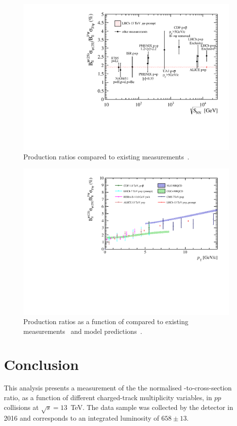 \documentclass[12pt,a4paper]{article}
\begin{document}
\begin{figure}[H]
  \begin{center}
  \includegraphics[width=0.7\linewidth]{pdf/Result/VariousMeasurements.pdf }
  \end{center}
  \caption{Production ratios compared to existing measurements~\cite{PHENIX:2016vmz}.}
\label{compare_total}
\end{figure}
\begin{figure}[H]
  \begin{center}
  \includegraphics[width=0.7\linewidth]{pdf/Result/Comparisons_PT_VariousMeasurements.pdf}
  \end{center}
  \caption{Production ratios as a function of \pt compared to existing measurements~\cite{PHENIX:2016vmz} and model predictions~\cite{Ma:2014mri}.}
\label{compare_pt}
\end{figure}



\cleardoublepage
\section{Conclusion}
\label{sec:conclusion}

This analysis presents a measurement of the the normalised \psitwos-to-\jpsi cross-section ratio, as a function of different charged-track multiplicity variables, in $pp$ collisions at $\sqrt{s}=13$~TeV. The data sample was collected by the \lhcb detector in 2016 and corresponds to an integrated luminosity of $658\pm 13$\invpb.
\end{document}
